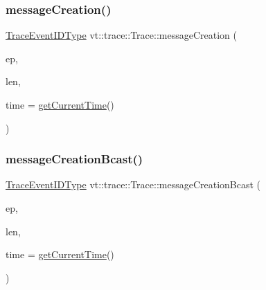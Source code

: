 \subsubsection{\texorpdfstring{message\+Creation()}{messageCreation()}}
{\footnotesize\ttfamily \hyperlink{namespacevt_1_1trace_a64a7185f3e102df8d8258f263ccd1582}{Trace\+Event\+I\+D\+Type} vt\+::trace\+::\+Trace\+::message\+Creation (\begin{DoxyParamCaption}\item[{\hyperlink{namespacevt_1_1trace_a3c14050715ba9eceaeff51fb3de64f2f}{Trace\+Entry\+I\+D\+Type} const}]{ep,  }\item[{\hyperlink{namespacevt_1_1trace_aeb598f45d67d41db7902e494f2f0ce59}{Trace\+Msg\+Len\+Type} const}]{len,  }\item[{double const}]{time = {\ttfamily \hyperlink{structvt_1_1trace_1_1_trace_a04cf6b76b4ced1bc90d246a34c948db5}{get\+Current\+Time}()} }\end{DoxyParamCaption})}

\mbox{\label{structvt_1_1trace_1_1_trace_ad034b14649101fb530eccfb4e2b958ce}} 
\subsubsection{\texorpdfstring{message\+Creation\+Bcast()}{messageCreationBcast()}}
{\footnotesize\ttfamily \hyperlink{namespacevt_1_1trace_a64a7185f3e102df8d8258f263ccd1582}{Trace\+Event\+I\+D\+Type} vt\+::trace\+::\+Trace\+::message\+Creation\+Bcast (\begin{DoxyParamCaption}\item[{\hyperlink{namespacevt_1_1trace_a3c14050715ba9eceaeff51fb3de64f2f}{Trace\+Entry\+I\+D\+Type} const}]{ep,  }\item[{\hyperlink{namespacevt_1_1trace_aeb598f45d67d41db7902e494f2f0ce59}{Trace\+Msg\+Len\+Type} const}]{len,  }\item[{double const}]{time = {\ttfamily \hyperlink{structvt_1_1trace_1_1_trace_a04cf6b76b4ced1bc90d246a34c948db5}{get\+Current\+Time}()} }\end{DoxyParamCaption})}

\mbox{\label{structvt_1_1trace_1_1_trace_aa14d58fb03a226e213f72bb03a13bb9f}} 
